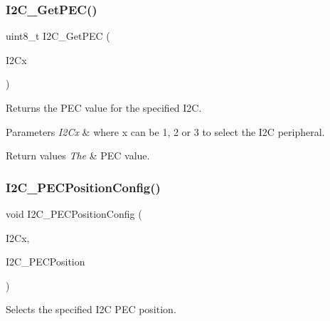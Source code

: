\subsubsection{\texorpdfstring{I2\+C\+\_\+\+Get\+P\+E\+C()}{I2C\_GetPEC()}}
{\footnotesize\ttfamily uint8\+\_\+t I2\+C\+\_\+\+Get\+P\+EC (\begin{DoxyParamCaption}\item[{I2\+C\+\_\+\+Type\+Def $\ast$}]{I2\+Cx }\end{DoxyParamCaption})}



Returns the P\+EC value for the specified I2C. 


\begin{DoxyParams}{Parameters}
{\em I2\+Cx} & where x can be 1, 2 or 3 to select the I2C peripheral. \\
\hline
\end{DoxyParams}

\begin{DoxyRetVals}{Return values}
{\em The} & P\+EC value. \\
\hline
\end{DoxyRetVals}
\mbox{\label{group___i2_c___group3_ga5d0f939bdd45542502827bf408f24161}} 
\subsubsection{\texorpdfstring{I2\+C\+\_\+\+P\+E\+C\+Position\+Config()}{I2C\_PECPositionConfig()}}
{\footnotesize\ttfamily void I2\+C\+\_\+\+P\+E\+C\+Position\+Config (\begin{DoxyParamCaption}\item[{I2\+C\+\_\+\+Type\+Def $\ast$}]{I2\+Cx,  }\item[{uint16\+\_\+t}]{I2\+C\+\_\+\+P\+E\+C\+Position }\end{DoxyParamCaption})}



Selects the specified I2C P\+EC position. 


